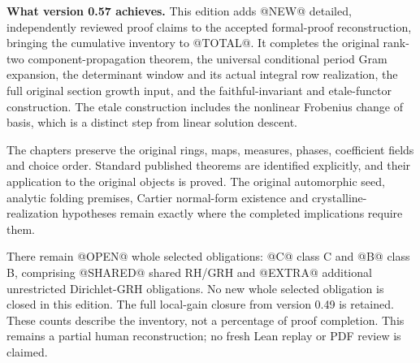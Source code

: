 \textbf{What version 0.57 achieves.}
This edition adds @NEW@ detailed, independently reviewed proof claims to
the accepted formal-proof reconstruction, bringing the cumulative inventory
to @TOTAL@.  It completes the original rank-two component-propagation
theorem, the universal conditional period Gram expansion, the determinant
window and its actual integral row realization, the full original section
growth input, and the faithful-invariant and etale-functor construction.
The etale construction includes the nonlinear Frobenius change of basis,
which is a distinct step from linear solution descent.

The chapters preserve the original rings, maps, measures, phases,
coefficient fields and choice order.  Standard published theorems are
identified explicitly, and their application to the original objects is
proved.  The original automorphic seed, analytic folding premises,
Cartier normal-form existence and crystalline-realization hypotheses
remain exactly where the completed implications require them.

There remain @OPEN@ whole selected obligations: @C@ class C and @B@
class B, comprising @SHARED@ shared RH/GRH and @EXTRA@ additional
unrestricted Dirichlet-GRH obligations.  No new whole selected obligation
is closed in this edition.  The full local-gain closure from version
0.49 is retained.  These counts describe the inventory, not a percentage
of proof completion.  This remains a partial human reconstruction;
no fresh Lean replay or PDF review is claimed.

